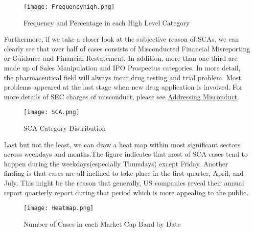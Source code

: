 \begin{figure}[H]
  \centering
  \texttt{[image: Frequencyhigh.png]}
   \caption{Frequency and Percentage in each High Level Category}
\end{figure}
Furthermore, if we take a closer look at the subjective reason of SCAs, we can clearly see that over half of cases consists of Misconducted Financial Misreporting or Guidance and Financial Restatement. In addition, more than one third are made up of Sales Manipulation and IPO Prospectus categories. In more detail, the pharmaceutical field will always incur drug testing and trial problem. Most problems appeared at the last stage when new drug application is involved. For 
more details of SEC charges of misconduct, please see \href{https://www.sec.gov/spotlight/enf-actions-fc.shtml}{\colorbox{Graylight}{Addressing Misconduct}}.
\begin{figure}[H]
  \centering
  \texttt{[image: SCA.png]}
   \caption{SCA Category Distribution}
\end{figure}
Last but not the least, we can draw a heat map within most significant sectors across weekdays and months.The figure indicates that most of SCA cases tend to happen during the weekdays(especially Thursdays) except Friday. Another finding is that cases are all inclined to take place in the first quarter, April, and July. This might be the reason that generally, US companies reveal their annual report quarterly report during that period which is more appealing to the public. 
\begin{figure}[H]
  \centering
  \texttt{[image: Heatmap.png]}
   \caption{Number of Cases in each Market Cap Band by Date}
\end{figure}



